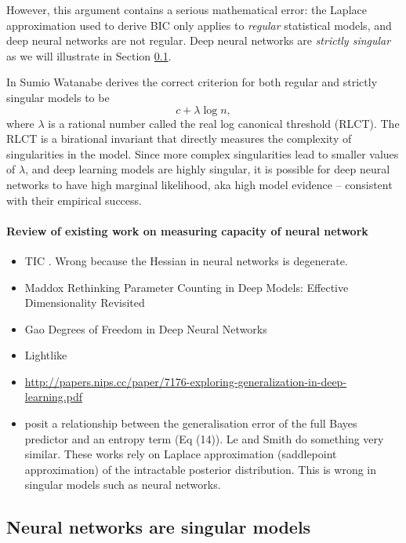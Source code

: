 \documentclass{article} %
\begin{document}
However, this argument contains a serious mathematical error: the Laplace approximation used to derive BIC only applies to \emph{regular} statistical models, and deep neural networks are not regular. Deep neural networks are \textit{strictly singular} as we will illustrate in Section \ref{section:nn_singular}. 

In \citep{watanabe_algebraic_2009} Sumio Watanabe derives the correct criterion for both regular and strictly singular models to be 
$$ c + \lambda \log n,$$ where $\lambda$ is a rational number called the real log canonical threshold (RLCT). The RLCT is a birational invariant \citep{kollar_birational_1998} that directly measures the complexity of singularities in the model. Since more complex singularities lead to smaller values of $\lambda$, and deep learning models are highly singular, it is possible for deep neural networks to have high marginal likelihood, aka high model evidence -- consistent with their empirical success. 

\paragraph{Review of existing work on measuring capacity of neural network}
\begin{itemize}
    \item TIC \cite{thomas_information_2019}. Wrong because the Hessian in neural networks is degenerate.
    \item Maddox \cite{maddox_rethinking_2020} Rethinking Parameter Counting in Deep Models: Effective Dimensionality Revisited
    \item Gao \cite{gao_degrees_2016} Degrees of Freedom in Deep Neural Networks
    \item Lightlike \cite{sun_lightlike_2020}
    \item \url{http://papers.nips.cc/paper/7176-exploring-generalization-in-deep-learning.pdf}
    \item \cite{zhang_energyentropy_2018} posit a relationship between the generalisation error of the full Bayes predictor and an entropy term (Eq (14)). Le and Smith \cite{le_bayesian_2018} do something very similar. These works rely on Laplace approximation (saddlepoint approximation) of the intractable posterior distribution. This is wrong in singular models such as neural networks. 
\end{itemize} 

\subsection{Neural networks are singular models}
\label{section:nn_singular}
\end{document}
